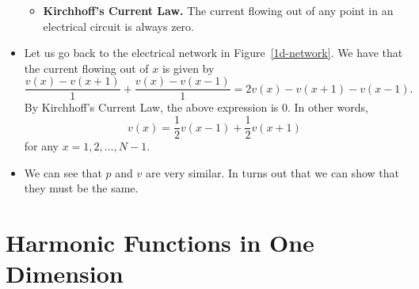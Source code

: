 \documentclass[10pt]{article}
\begin{document}
\begin{itemize}
\begin{itemize}
			\item {\bf Kirchhoff's Current Law.} The current flowing
			out of any point in an electrical circuit is always zero.
		\end{itemize}
	
	\item Let us go back to the electrical network in Figure~\ref{1d-network}.
		We have that the current flowing out of $x$ is given by
		$$\frac{v(x) - v(x+1)}{1} + \frac{v(x) - v(x-1)}{1} 
		= 2v(x) - v(x+1) - v(x-1).$$
		By Kirchhoff's Current Law, the above expression is $0$.
		In other words,
		$$v(x) = \frac{1}{2} v(x-1) + \frac{1}{2} v(x+1)$$
		for any $x = 1, 2, \dotsc, N-1.$
	
	\item We can see that $p$ and $v$ are very similar. In turns out
		that we can show that they must be the same.
\end{itemize}

\section{Harmonic Functions in One Dimension}
\end{document}
